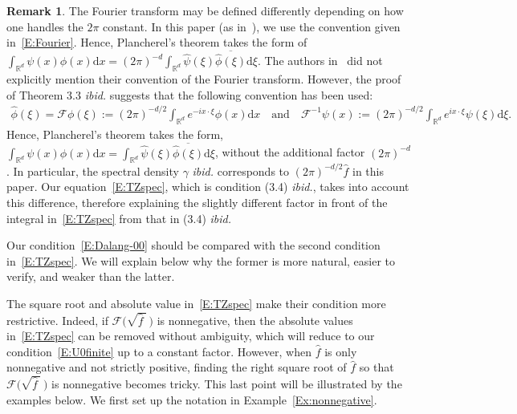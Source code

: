 \documentclass[a4paper,11pt]{article}%
\theoremstyle{plain}
\theoremstyle{definition}
\newtheorem{remark}[theorem]{Remark}
\numberwithin{equation}{section}
\newcommand{\R}{\mathbb{R}}
\newcommand{\ud}{\ensuremath{\mathrm{d}}}
\begin{document}
\begin{remark}\label{R:Fourier}
  The Fourier transform may be defined differently depending on how one handles the $2\pi$ constant.
  In this paper (as in~\cite{chen.kim:19:nonlinear,chen.huang:19:comparison}), we use the convention
  given in~\eqref{E:Fourier}. Hence, Plancherel's theorem takes the form of $\int_{\R^d} \psi(x)
  \phi(x)\ud x = (2\pi)^{-d} \int_{\R^d} \widehat{\psi}(\xi) \overline{\widehat{\phi}(\xi)}\ud \xi$.
  The authors in~\cite{tessitore.zabczyk:98:invariant} did not explicitly mention their convention
  of the Fourier transform. However, the proof of Theorem 3.3 \textit{ibid.} suggests that the
  following convention has been used:
	\begin{align*}
	\widehat{\phi}(\xi)      = \mathcal{F}\phi(\xi) := (2\pi)^{-d/2} \int_{\R^d} e^{-i x\cdot\xi} \phi(x)\ud x \quad \text{and} \quad
	\mathcal{F}^{-1}\psi(x) := (2\pi)^{-d/2} \int_{\R^d} e^{i x\cdot\xi} \psi(\xi)\ud \xi.
	\end{align*}
  Hence, Plancherel's theorem takes the form, $\int_{\R^d} \psi(x) \phi(x)\ud x = \int_{\R^d}
  \widehat{\psi}(\xi) \overline{\widehat{\phi}(\xi)}\ud \xi$, without the additional factor
  $(2\pi)^{-d}$. In particular, the spectral density $\gamma$ \textit{ibid.} corresponds to
  $\left(2\pi\right)^{-d/2}\widehat{f}$ in this paper. Our equation~\eqref{E:TZspec}, which is
  condition (3.4) \textit{ibid.}, takes into account this difference, therefore explaining the
  slightly different factor in front of the integral in~\eqref{E:TZspec} from that in (3.4)
  \textit{ibid.}
\end{remark}

Our condition~\eqref{E:Dalang-00} should be compared with the second condition in~\eqref{E:TZspec}.
We will explain below why the former is more natural, easier to verify, and weaker than the latter.

%
The square root and absolute value in~\eqref{E:TZspec} make their condition more restrictive.
Indeed, if $\mathcal{F}\big(\sqrt{\widehat{f}\:}\:\big)$ is nonnegative, then the absolute values
in~\eqref{E:TZspec} can be removed without ambiguity, which will reduce to our
condition~\eqref{E:U0finite} up to a constant factor. However, when $\widehat{f}$ is only
nonnegative and not strictly positive, finding the right square root of $\widehat{f}$ so that
$\mathcal{F}\big(\sqrt{\widehat{f}\:}\:\big)$ is nonnegative becomes tricky. This last point will be
illustrated by the examples below. We first set up the notation in Example~\ref{Ex:nonnegative}.
%
%
\end{document}
